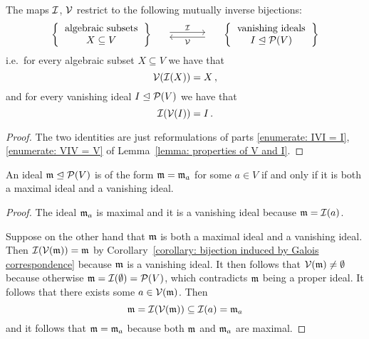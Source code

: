 \begin{corollary}
  \label{corollary: bijection induced by Galois correspondence}
  The maps $\mathcal{I}$, $\mathcal{V}$ restrict to the following mutually inverse bijections:
  \[
    \begin{matrix}
        \left\{
          \begin{tabular}{c}
              algebraic subsets \\
              $X \subseteq V$
          \end{tabular}
        \right\}
      & \begin{tikzcd}[column sep = large]
            {}
            \arrow[shift left]{r}{\mc{I}}
          & {}
            \arrow[shift left]{l}{\mc{V}}
        \end{tikzcd}
      & \left\{
          \begin{tabular}{c}
            vanishing ideals \\
            $I \idealleq \mc{P}(V)$
          \end{tabular}
        \right\}
    \end{matrix}
  \]
  i.e.\ for every algebraic subset $X \subseteq V$ we have that
  \[
    \mathcal{V}(\mathcal{I}(X)) = X \,,
  \]
  and for every vanishing ideal $I \trianglelefteq \mathcal{P}(V)$ we have that
  \[
    \mathcal{I}(\mathcal{V}(I)) = I \,.
  \]
\end{corollary}


\begin{proof}
  The two identities are just reformulations of parts \ref*{enumerate: IVI = I}, \ref*{enumerate: VIV = V} of Lemma~\ref{lemma: properties of V and I}.
\end{proof}


\begin{lemma}
  \label{lemma: correspence between points and vanishing maximal ideals}
  An ideal $\mathfrak{m} \trianglelefteq \mathcal{P}(V)$ is of the form $\mathfrak{m} = \mathfrak{m}_a$ for some $a \in V$ if and only if it is both a maximal ideal and a vanishing ideal.
\end{lemma}


\begin{proof}
  The ideal $\mathfrak{m}_a$ is maximal and it is a vanishing ideal because $\mathfrak{m} = \mathcal{I}(a)$.
  
  Suppose on the other hand that $\mathfrak{m}$ is both a maximal ideal and a vanishing ideal.
  Then $\mathcal{I}(\mathcal{V}(\mathfrak{m})) = \mathfrak{m}$ by Corollary~\ref{corollary: bijection induced by Galois correspondence} because $\mathfrak{m}$ is a vanishing ideal.
  It then follows that $\mathcal{V}(\mathfrak{m}) \neq \emptyset$ because otherwise $\mathfrak{m} = \mathcal{I}(\emptyset) = \mathcal{P}(V)$, which contradicts $\mathfrak{m}$ being a proper ideal.
  It follows that there exists some $a \in \mathcal{V}(\mathfrak{m})$.
  Then
  \[
              \mathfrak{m}
    =         \mathcal{I}(\mathcal{V}(\mathfrak{m}))
    \subseteq \mathcal{I}(a)
    =         \mathfrak{m}_a
  \]
  and it follows that $\mathfrak{m} = \mathfrak{m}_a$ because both $\mathfrak{m}$ and $\mathfrak{m}_a$ are maximal.
\end{proof}

